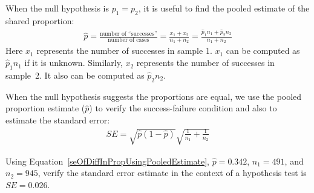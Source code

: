 \begin{termBox}{
When the null hypothesis is $p_1 = p_2$, it is useful to find the pooled estimate of the shared proportion:
\begin{eqnarray*}
\hat{p} = \frac{\text{number of ``successes''}}{\text{number of cases}} = \frac{x_1+x_2}{n_1+n_2}=\frac{\hat{p}_1n_1 + \hat{p}_2n_2}{n_1 + n_2}
\end{eqnarray*}
Here $x_1$ represents the number of successes in sample 1. $x_1$ can be computed as $\hat{p}_1n_1$ if it is unknown. Similarly, $x_2$ represents the number of successes in sample~2. It also can be computed as $\hat{p}_2n_2$.}
\end{termBox}

\begin{tipBox}{
When the null hypothesis suggests the proportions are equal, we use the pooled proportion estimate ($\hat{p}$) to verify the success-failure condition and also to estimate the standard error:
\begin{eqnarray}
SE =\sqrt{\hat{p}(1-\hat{p})}\sqrt{\frac{1}{n_1} + \frac{1}{n_2}}
\label{seOfDiffInPropUsingPooledEstimate}
\end{eqnarray}}
\end{tipBox}

\begin{exercise}\label{verifySEOfPooledEstimateOf24DWithCancerNoCancerDogs}
Using Equation~\eqref{seOfDiffInPropUsingPooledEstimate}, $\hat{p}=0.342$, $n_1 = 491$, and $n_2=945$, verify the standard error estimate in the context of a hypothesis test is $SE = 0.026$.
\end{exercise}

